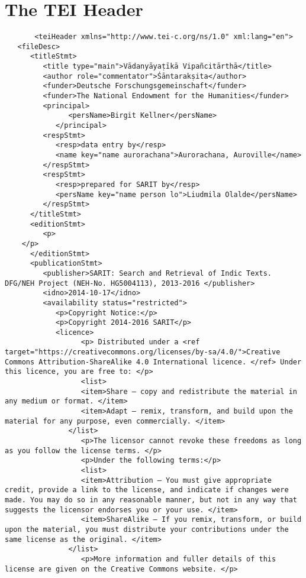 \documentclass[article,12pt,a4paper]{memoir}%
\begin{document}
	 \chapter{The TEI Header}
	 \begin{verbatim}
       <teiHeader xmlns="http://www.tei-c.org/ns/1.0" xml:lang="en">
   <fileDesc>
      <titleStmt>
         <title type="main">Vādanyāyaṭīkā Vipañcitārthā</title>
         <author role="commentator">Śāntarakṣita</author>
         <funder>Deutsche Forschungsgemeinschaft</funder>
         <funder>The National Endowment for the Humanities</funder>
         <principal>
	           <persName>Birgit Kellner</persName>
	        </principal>
         <respStmt>
            <resp>data entry by</resp>
            <name key="name aurorachana">Aurorachana, Auroville</name>
         </respStmt>
         <respStmt>
            <resp>prepared for SARIT by</resp>
            <persName key="name person lo">Liudmila Olalde</persName>
         </respStmt>
      </titleStmt>
      <editionStmt>
         <p>
	</p>
      </editionStmt>
      <publicationStmt>
         <publisher>SARIT: Search and Retrieval of Indic Texts. DFG/NEH Project (NEH-No. HG5004113), 2013-2016 </publisher>
         <idno>2014-10-17</idno>
         <availability status="restricted">
            <p>Copyright Notice:</p>
            <p>Copyright 2014-2016 SARIT</p>
            <licence>
	              <p> Distributed under a <ref target="https://creativecommons.org/licenses/by-sa/4.0/">Creative Commons Attribution-ShareAlike 4.0 International licence. </ref> Under this licence, you are free to: </p>
	              <list>
                  <item>Share — copy and redistribute the material in any medium or format. </item>
                  <item>Adapt — remix, transform, and build upon the material for any purpose, even commercially. </item>
               </list>
	              <p>The licensor cannot revoke these freedoms as long as you follow the license terms. </p>
	              <p>Under the following terms:</p>
	              <list>
                  <item>Attribution — You must give appropriate credit, provide a link to the license, and indicate if changes were made. You may do so in any reasonable manner, but not in any way that suggests the licensor endorses you or your use. </item>
                  <item>ShareAlike — If you remix, transform, or build upon the material, you must distribute your contributions under the same license as the original. </item>
               </list>
	              <p>More information and fuller details of this license are given on the Creative Commons website. </p>

\end{verbatim}
\end{document}
